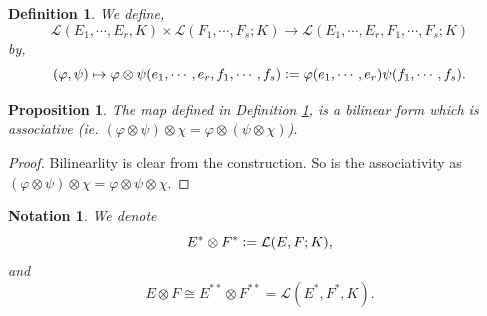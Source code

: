 \documentclass[10pt]{article}
\newtheorem{proposition}{Proposition}[section]
\newtheorem{definition}{Definition}[section]
\newtheorem{notation}{Notation}[section]
\newcommand{\defeq}{\vcentcolon=}
\begin{document}
\begin{definition}
  \label{definition_tensoring_multilinear}
  We define,
  \begin{equation*}
    \mathcal{L}(E_1,\cdots,E_r,K)\times \mathcal{L}(F_1,\cdots,F_s;K)\to \mathcal{L}(E_1,\cdots,E_r,F_1,\cdots,F_s;K)
  \end{equation*}
  by,
  \begin{equation*}
    (\varphi,\psi)\mapsto\varphi\otimes\psi(e_1,\cdots,e_r,f_1,\cdots,f_s)\defeq \varphi(e_1,\cdots,e_r)\psi(f_1,\cdots,f_s).
  \end{equation*}
\end{definition}

\begin{proposition}
  The map defined in Definition \ref{definition_tensoring_multilinear}, is a bilinear form which is associative (ie. $(\varphi\otimes\psi)\otimes\chi = \varphi\otimes(\psi\otimes\chi)$).
\end{proposition}

\begin{proof}
  Bilinearlity is clear from the construction. So is the associativity as $(\varphi\otimes\psi)\otimes\chi = \varphi\otimes\psi\otimes\chi$.
\end{proof}

\begin{notation}
  We denote 
  \begin{equation*}
    E^*\otimes F^*\defeq \mathcal{L}(E,F;K),
  \end{equation*}
  and 
  \begin{equation*}
    E\otimes F \cong E^{**}\otimes F^{**} = \mathcal{L}(E^*,F^*,K).
  \end{equation*}
\end{notation}
\end{document}
